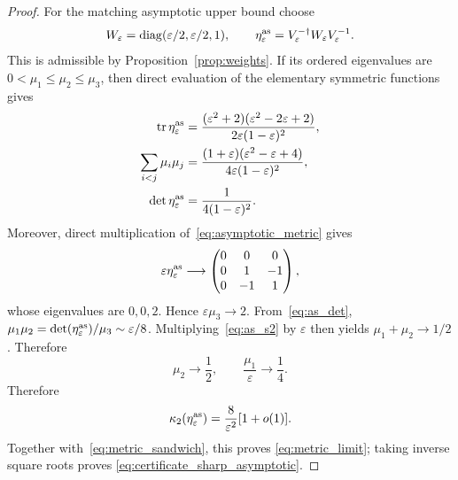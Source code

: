 \begin{proof}
For the matching asymptotic upper bound choose
\begin{equation}\label{eq:asymptotic_metric}
 W_\varepsilon=\operatorname{diag}(\varepsilon/2,\varepsilon/2,1),\qquad
 \eta^{\rm as}_\varepsilon=
 V_\varepsilon^{-\dagger}W_\varepsilon V_\varepsilon^{-1}.
\end{equation}
This is admissible by Proposition~\ref{prop:weights}.  If its ordered
eigenvalues are $0<\mu_1\leq\mu_2\leq\mu_3$, then direct evaluation of
the elementary symmetric functions gives
\begin{align}
 \operatorname{tr}\eta^{\rm as}_\varepsilon
 &=\frac{(\varepsilon^2+2)(\varepsilon^2-2\varepsilon+2)}
 {2\varepsilon(1-\varepsilon)^2},\label{eq:as_trace}\\
 \sum_{i<j}\mu_i\mu_j
 &=\frac{(1+\varepsilon)(\varepsilon^2-\varepsilon+4)}
 {4\varepsilon(1-\varepsilon)^2},\label{eq:as_s2}\\
 \det\eta^{\rm as}_\varepsilon&=\frac1{4(1-\varepsilon)^2}.
 \label{eq:as_det}
\end{align}
Moreover, direct multiplication of~\eqref{eq:asymptotic_metric} gives
\begin{equation}
 \varepsilon\eta^{\rm as}_\varepsilon\longrightarrow
 \begin{pmatrix}0&0&0\\0&1&-1\\0&-1&1\end{pmatrix},
\end{equation}
whose eigenvalues are $0,0,2$.  Hence
$\varepsilon\mu_3\to2$.  From~\eqref{eq:as_det},
$\mu_1\mu_2=\det(\eta^{\rm as}_\varepsilon)/\mu_3
\sim\varepsilon/8$.  Multiplying~\eqref{eq:as_s2} by
$\varepsilon$ then yields $\mu_1+\mu_2\to1/2$.
Therefore
\begin{equation}
 \mu_2\to\frac12,\qquad
 \frac{\mu_1}{\varepsilon}\to\frac14.
\end{equation}
Therefore
\begin{equation}
 \kappa_2(\eta^{\rm as}_\varepsilon)
 =\frac{8}{\varepsilon^2}[1+o(1)].
\end{equation}
Together with~\eqref{eq:metric_sandwich}, this proves
\eqref{eq:metric_limit}; taking inverse square roots proves
\eqref{eq:certificate_sharp_asymptotic}.
\end{proof}

